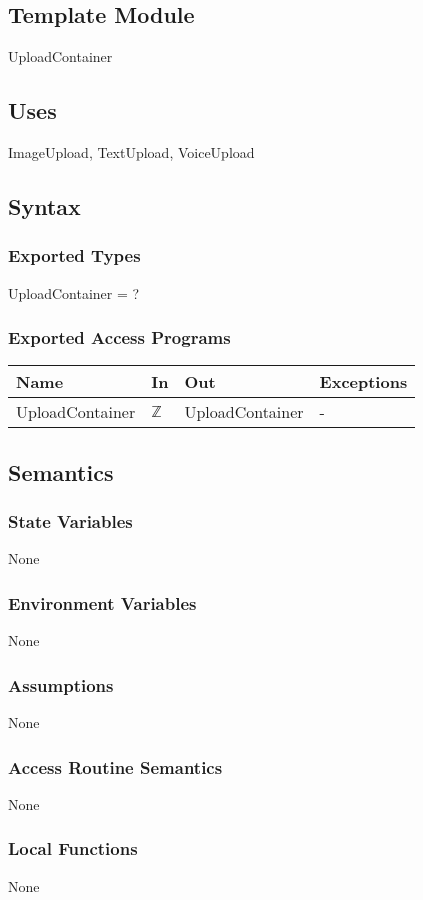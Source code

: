 \documentclass[12pt, titlepage]{article}
\begin{document}
\subsection{Template Module}
UploadContainer
\subsection{Uses}
ImageUpload, TextUpload, VoiceUpload
\subsection{Syntax}
\subsubsection{Exported Types}
UploadContainer = ?
\subsubsection{Exported Access Programs}
\begin{center}
	\begin{tabular}{p{3cm} p{5cm} p{5cm} p{2cm}}
		\hline
		\textbf{Name} & \textbf{In} & \textbf{Out} & \textbf{Exceptions} \\
		\hline
		UploadContainer & $\mathbb{Z}$ & UploadContainer & - \\
		\hline
	\end{tabular}
\end{center}
\subsection{Semantics}
\subsubsection{State Variables}
None
\subsubsection{Environment Variables}
None
\subsubsection{Assumptions}
None
\subsubsection{Access Routine Semantics}
None
\subsubsection{Local Functions}
None
\end{document}

